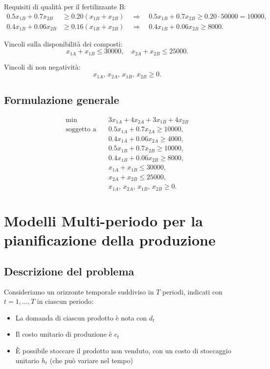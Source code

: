 Requisiti di qualità per il fertilizzante B:
\[
\begin{aligned}
0.5x_{1B}+0.7x_{2B} &\geq 0.20(x_{1B}+x_{2B})\quad\Rightarrow\quad 0.5x_{1B}+0.7x_{2B}\geq 0.20\cdot50000=10000, \\
0.4x_{1B}+0.06x_{2B} &\geq 0.16(x_{1B}+x_{2B})\quad\Rightarrow\quad 0.4x_{1B}+0.06x_{2B}\geq 8000.
\end{aligned}
\]

Vincoli sulla disponibilità dei composti:
\[
x_{1A}+x_{1B}\leq 30000,\quad x_{2A}+x_{2B}\leq 25000.
\]

Vincoli di non negatività:
\[
x_{1A},\, x_{2A},\, x_{1B},\, x_{2B}\geq 0.
\]

\subsection{Formulazione generale}
\[
\begin{aligned}
\min \quad & 3x_{1A}+4x_{2A}+3x_{1B}+4x_{2B} \\
\text{soggetto a}\quad 
& 0.5x_{1A}+0.7x_{2A}\geq 10000, \\
& 0.4x_{1A}+0.06x_{2A}\geq 4000, \\
& 0.5x_{1B}+0.7x_{2B}\geq 10000, \\
& 0.4x_{1B}+0.06x_{2B}\geq 8000, \\
& x_{1A}+x_{1B}\leq 30000, \\
& x_{2A}+x_{2B}\leq 25000, \\
& x_{1A},\, x_{2A},\, x_{1B},\, x_{2B}\geq 0.
\end{aligned}
\]

\section{Modelli Multi-periodo per la pianificazione della produzione}
\subsection{Descrizione del problema}

Consideriamo un orizzonte temporale suddiviso in $T$ periodi, indicati con $t=1,\ldots,T$ in ciascun periodo:
\begin{itemize}
    \item La domanda di ciascun prodotto è nota con $d_t$
    \item Il costo unitario di produzione è $c_t$
    \item È possibile stoccare il prodotto non venduto, con un costo di stoccaggio unitario $h_t$ (che può variare nel tempo)
\end{itemize}

